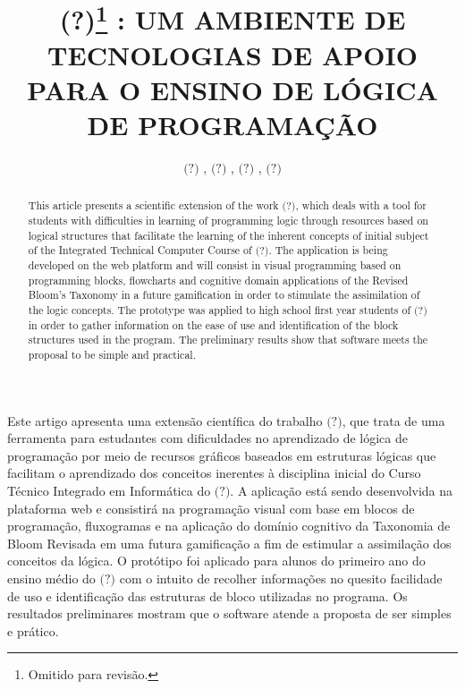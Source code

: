 \documentclass[12pt]{article}
\title{(?)\footnote{Omitido para revisão.} : UM AMBIENTE DE TECNOLOGIAS DE APOIO PARA O ENSINO DE LÓGICA DE PROGRAMAÇÃO}
\author{$\textbf{(?)}$ \inst{1}, $\textbf{(?)}$ \inst{1}, $\textbf{(?)}$ \inst{1}, $\textbf{(?)}$ \inst{1}}
\begin{document}
 

\maketitle

\begin{abstract}
This article presents a scientific extension of the work $\textit{(?)}$, which deals with a tool for students with difficulties in learning of programming logic through resources based on logical structures that facilitate the learning of the inherent concepts of initial subject of the Integrated Technical Computer Course of $\textit{(?)}$. The application is being developed on the web platform and will consist in visual programming based on programming blocks, flowcharts and cognitive domain applications of the Revised Bloom's Taxonomy in a future gamification in order to stimulate the assimilation of the logic concepts. The prototype was applied to high school first year students of $\textit{(?)}$ in order to gather information on the ease of use and identification of the block structures used in the program. The preliminary results show that software meets the proposal to be simple and practical.
\end{abstract}
     
\begin{resumo}
Este artigo apresenta uma extensão científica do trabalho $\textit{(?)}$, que trata de uma ferramenta para estudantes com dificuldades no aprendizado de lógica de programação por meio de recursos gráficos baseados em estruturas lógicas que facilitam o aprendizado dos conceitos inerentes à disciplina inicial do Curso Técnico Integrado em Informática do $\textit{(?)}$. A aplicação está sendo desenvolvida na plataforma web e consistirá na programação visual com base em blocos de programação, fluxogramas e na aplicação do domínio cognitivo da Taxonomia de Bloom Revisada em uma futura gamificação a fim de estimular a assimilação dos conceitos da lógica.  O protótipo foi aplicado para alunos do primeiro ano do ensino médio do $\textit{(?)}$ com o intuito de recolher informações no quesito facilidade de uso e identificação das estruturas de bloco utilizadas no programa. Os resultados preliminares mostram que o software atende a proposta de ser simples e prático.  
\end{resumo}
\end{document}
